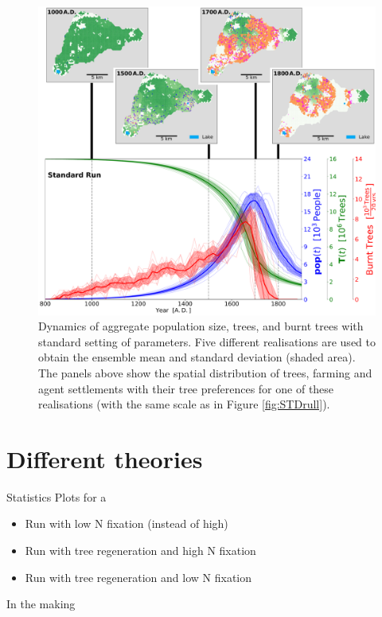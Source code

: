 \begin{figure}
	\centering
	\includegraphics[width=1.0\linewidth]{images/Results/Standard/EnsembleStatistics+Panels}
	\caption{Dynamics of aggregate population size, trees, and burnt trees with standard setting of parameters. Five different realisations are used to obtain the ensemble mean and standard deviation (shaded area). The panels above show the spatial distribution of trees, farming and agent settlements with their tree preferences for one of these realisations (with the same scale as in Figure \ref{fig:STDrull}). }
	\label{fig:STDstats}
\end{figure}


%

\section{Different theories}
Statistics Plots for a
\begin{itemize}
	\item Run with low N fixation (instead of high)
	\item Run with tree regeneration and high N fixation
	\item Run with tree regeneration and low N fixation
\end{itemize}
In the making

